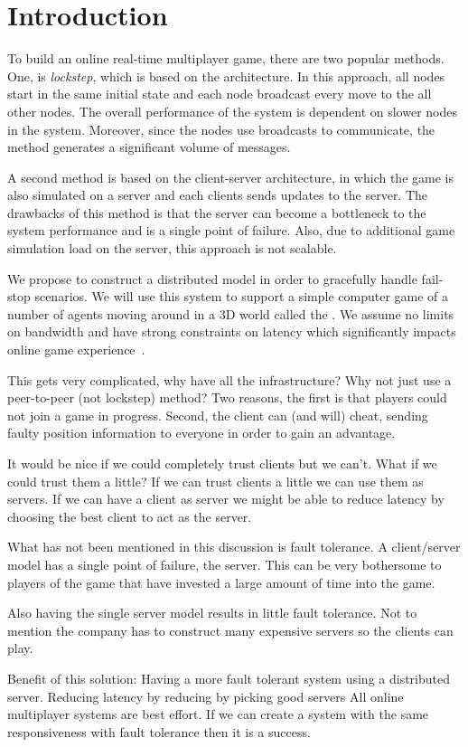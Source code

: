 
\section{Introduction}
\label{sec:Intro}

To build an online real-time  multiplayer game, there are two popular methods.
One, is \ptoP \emph{lockstep}, which is based on the \ptoP architecture.
In this approach, all nodes start in the same initial state and each node broadcast every move to the all other nodes.
The overall performance of the system is dependent on slower nodes in the system.
Moreover, since the nodes use broadcasts to communicate, the method generates a significant volume of messages.

A second method is based on the client-server architecture, in which the game is also simulated on a server and each clients sends updates to the server.
The drawbacks of this method is that the server can become a bottleneck to the system performance and is a single point of failure.
Also, due to additional game simulation load on the server, this approach is not scalable.

We propose to construct a distributed \clientServer model in order to gracefully handle fail-stop scenarios.
We will use this system to support a simple computer game of a number of agents moving around in a 3D world called the \gamestate.
We assume no limits on bandwidth and have strong constraints on latency which significantly impacts online game experience~\cite{Claypool:2006:LPA:1167838.1167860}.

This gets very complicated, why have all the infrastructure? Why not just use a peer-to-peer (not lockstep) method? Two reasons, the first is that players could not join a game in progress. Second, the client can (and will) cheat, sending faulty position information to everyone in order to gain an advantage.

It would be nice if we could completely trust clients but we can’t. What if we could trust them a little? If we can trust clients a little we can use them as servers. If we can have a client as server we might be able to reduce latency by choosing the best client to act as the server.

What has not been mentioned in this discussion is fault tolerance. A client/server model has a single point of failure, the server. This can be very bothersome to players of the game that have invested a large amount of time into the game. 

Also having the single server model results in little fault tolerance. Not to mention the company has to construct many expensive servers so the clients can play.

Benefit of this solution:
Having a more fault tolerant system using a distributed server. 
Reducing latency by reducing by picking good servers
All online multiplayer systems are best effort. If we can create a system with the same responsiveness with fault tolerance then it is a success.

	

